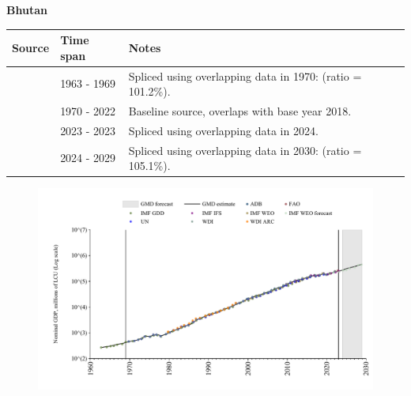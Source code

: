\documentclass[12pt,a4paper,landscape]{article}
\begin{document}
\begin{adjustbox}{max totalsize={\paperwidth}{\paperheight},center}
\begin{minipage}[t][\textheight][t]{\textwidth}
\vspace*{0.5cm}
{}
\begin{center}
{\Large\bfseries Bhutan}
\end{center}
\vspace{0.5cm}
\begin{table}[H]
\centering
\small
\begin{tabular}{|l|l|l|}
\hline
\textbf{Source} & \textbf{Time span} & \textbf{Notes} \\
\hline
\rowcolor{white}\cite{IMF_GDD}& 1963 - 1969 &Spliced using overlapping data in 1970: (ratio = 101.2\%).\\
\rowcolor{lightgray}\cite{WDI}& 1970 - 2022 &Baseline source, overlaps with base year 2018.\\
\rowcolor{white}\cite{FAO}& 2023 - 2023 &Spliced using overlapping data in 2024.\\
\rowcolor{lightgray}\cite{IMF_WEO_forecast}& 2024 - 2029 &Spliced using overlapping data in 2030: (ratio = 105.1\%).\\
\hline
\end{tabular}
\end{table}
\begin{figure}[H]
\centering
\includegraphics[width=\textwidth,height=0.6\textheight,keepaspectratio]{graphs/BTN_nGDP.pdf}
\end{figure}
\end{minipage}
\end{adjustbox}
\end{document}
